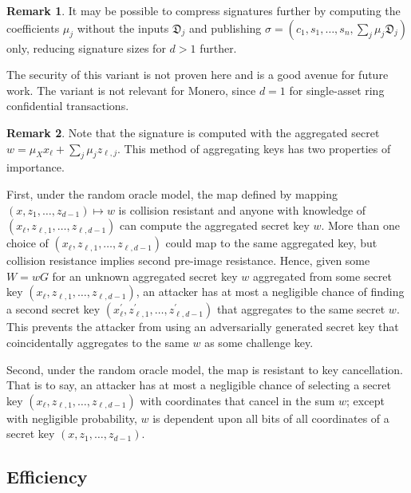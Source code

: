 \documentclass{mrl}
\theoremstyle{plain}
\theoremstyle{definition}
\newtheorem{remark}{Remark}[section]
\begin{document}
\begin{remark}
It may be possible to compress signatures further by  computing the coefficients $\mu_j$ without the inputs $\mathfrak{D}_j$ and publishing $\sigma = (c_1, s_1, \ldots, s_n, \sum_j \mu_j \mathfrak{D}_j)$ only, reducing signature sizes for $d > 1$ further. 

The security of this variant is not proven here and is a good avenue for future work. The variant is not relevant for Monero, since $d=1$ for single-asset ring confidential transactions.
\end{remark}

\begin{remark}


Note that the signature is computed with the aggregated secret $w = \mu_X x_\ell + \sum_j \mu_j z_{\ell,j}$. This method of aggregating keys has two properties of importance.

First, under the random oracle model, the map defined by mapping $(x, z_1, \ldots, z_{d-1}) \mapsto w$ is collision resistant and anyone with knowledge of $(x_\ell, z_{\ell,1}, \ldots, z_{\ell,d-1})$ can compute the aggregated secret key $w$. More than one choice of $(x_\ell, z_{\ell,1}, \ldots, z_{\ell,d-1})$ could map to the same aggregated key, but collision resistance implies second pre-image resistance. Hence, given some $W = wG$ for an unknown aggregated secret key $w$ aggregated from some secret key $(x_\ell, z_{\ell,1}, \ldots, z_{\ell,d-1})$, an attacker has at most a negligible chance of finding a second secret key $(x_\ell^\prime, z_{\ell,1}^\prime, \ldots, z_{\ell,d-1}^\prime)$ that aggregates to the same secret $w$. This prevents the attacker from using an adversarially generated secret key that coincidentally aggregates to the same $w$ as some challenge key.


Second, under the random oracle model, the map is resistant to key cancellation. That is to say, an attacker has at most a negligible chance of selecting a secret key $(x_\ell, z_{\ell, 1}, \ldots, z_{\ell, d-1})$ with coordinates that cancel in the sum $w$; except with negligible probability, $w$ is dependent upon all bits of all coordinates of a secret key $(x, z_1, \ldots, z_{d-1})$. 

\end{remark}

\subsection{Efficiency}
\end{document}
